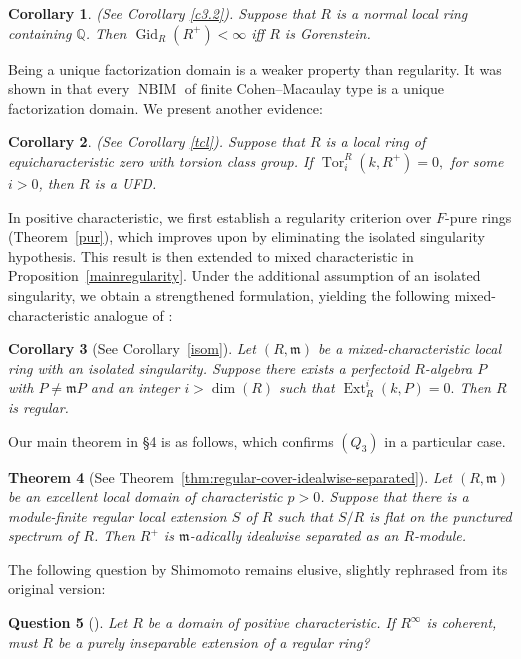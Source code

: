 \documentclass[12pt,reqno]{amsart}
\newtheorem{theorem}{Theorem}[section]
\newtheorem{corollary}[theorem]{Corollary}
\newtheorem{question}[theorem]{Question}
\theoremstyle{definition}
\theoremstyle{remark}
\theoremstyle{cited}
\theoremstyle{remark}
\theoremstyle{citeddef}
\DeclareMathOperator{\Ext}{Ext}
\DeclareMathOperator{\Tor}{Tor}
\DeclareMathOperator{\NBIM}{NBIM}
\newcommand{\fm}{\mathfrak{m}}
\begin{document}
	
	\begin{corollary}(See Corollary \ref{c3.2}).
		Suppose that $R$ is a normal local ring containing $\mathbb{Q}$. Then   $\operatorname{Gid}_R(R^+)<\infty$ iff $R$ is Gorenstein.
	\end{corollary}
	
	
	
	
	Being a unique factorization domain is a weaker property than regularity. It was shown in \cite[Proposition~5.6]{Elham} that every $\NBIM$ of finite Cohen--Macaulay type is a unique factorization domain. We present another evidence:
	
	\begin{corollary} (See Corollary \ref{tcl}).
		Suppose that \( R \) is a local ring of equicharacteristic zero with torsion class group. If
		\(
		\Tor_i^R(k,R^+)=0,
		\) for some $i>0$,
		then \( R \) is a UFD.
	\end{corollary}
	

	
	
	In positive characteristic, we first establish a regularity criterion over 
	$F$-pure rings (Theorem~\ref{pur}), which improves upon 
	\cite[Proposition 5.15]{Elham} by eliminating the isolated singularity 
	hypothesis. This result is then extended to mixed characteristic in 
	Proposition~\ref{mainregularity}. Under the additional assumption of an isolated 
	singularity, we obtain a strengthened formulation, yielding the following 
	mixed-characteristic analogue of \cite[Proposition 5.17]{Elham}:
	
	\begin{corollary}[See Corollary~\ref{isom}]\label{mixedpure}
		Let $(R, \mathfrak{m})$ be a mixed-characteristic local ring with an isolated 
		singularity. Suppose there exists a perfectoid $R$-algebra $P$ with 
		$P \neq \mathfrak{m}P$ and an integer $i > \dim(R)$ such that
		\(\Ext_R^i(k, P) = 0.\)
		Then $R$ is regular.
	\end{corollary}
	
	
	Our main theorem in \S4 is as follows, which confirms $(Q_3)$ in a particular case.
	
	\begin{theorem}[See Theorem~\ref{thm:regular-cover-idealwise-separated}]
		Let $(R,\fm)$ be an excellent local domain of characteristic $p>0$. Suppose
		that there is a module-finite regular local extension
		$S$ of $R$
		such that $S/R$ is flat on the punctured spectrum of $R$.
		Then $R^+$ is $\fm$-adically idealwise separated as an $R$-module.
	\end{theorem}
	\medskip
	\noindent
	The following question by Shimomoto remains elusive, slightly rephrased from its original version: 
	\begin{question}[{\cite[Question~4]{Shi10}}]
		Let $R$ be a domain of positive characteristic. If $R^{\infty}$ is coherent, must $R$ be a purely inseparable extension of a regular ring?
	\end{question}
	
\end{document}
